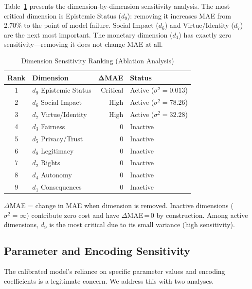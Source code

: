 \documentclass[journal]{IEEEtran}
\begin{document}
Table~\ref{tab:sensitivity} presents the dimension-by-dimension sensitivity analysis.
The most critical dimension is Epistemic Status ($d_9$): removing it increases MAE from 2.70\% to the point of model failure.
Social Impact ($d_6$) and Virtue/Identity ($d_7$) are the next most important.
The monetary dimension ($d_1$) has exactly zero sensitivity---removing it does not change MAE at all.

\begin{table}[!t]
\renewcommand{\arraystretch}{1.15}
\caption{Dimension Sensitivity Ranking (Ablation Analysis)}
\label{tab:sensitivity}
\centering
\begin{tabular}{c l r l}
\toprule
\textbf{Rank} & \textbf{Dimension} & $\boldsymbol{\Delta}$\textbf{MAE} & \textbf{Status} \\
\midrule
1 & $d_9$ Epistemic Status   & Critical & Active ($\sigma^2=0.013$) \\
2 & $d_6$ Social Impact      & High     & Active ($\sigma^2=78.26$) \\
3 & $d_7$ Virtue/Identity    & High     & Active ($\sigma^2=32.28$) \\
4 & $d_3$ Fairness           & 0        & Inactive \\
5 & $d_5$ Privacy/Trust      & 0        & Inactive \\
6 & $d_8$ Legitimacy         & 0        & Inactive \\
7 & $d_2$ Rights             & 0        & Inactive \\
8 & $d_4$ Autonomy           & 0        & Inactive \\
9 & $d_1$ Consequences       & 0        & Inactive \\
\bottomrule
\end{tabular}
\begin{flushleft}
\footnotesize{$\Delta$MAE = change in MAE when dimension is removed.
Inactive dimensions ($\sigma^2 = \infty$) contribute zero cost and have $\Delta$MAE\,=\,0 by construction.
Among active dimensions, $d_9$ is the most critical due to its small variance (high sensitivity).}
\end{flushleft}
\end{table}

\subsection{Parameter and Encoding Sensitivity}

The calibrated model's reliance on specific parameter values and encoding coefficients is a legitimate concern.
We address this with two analyses.
\end{document}
